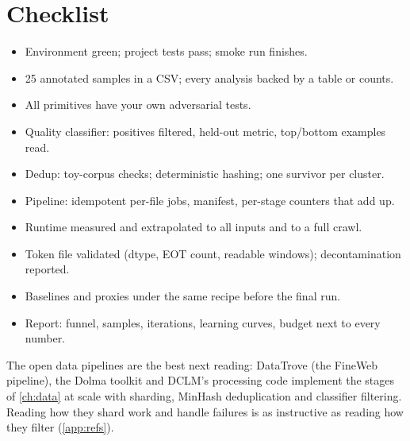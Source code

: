 \section{Checklist}\label{sec:proj4:checklist}

\begin{itemize}
  \item[$\square$] Environment green; project tests pass;  smoke run finishes.
  \item[$\square$] 25 annotated samples in a CSV; every analysis backed by a table or counts.
  \item[$\square$] All primitives have your own adversarial tests.
  \item[$\square$] Quality classifier: positives filtered, held-out metric, top/bottom examples read.
  \item[$\square$] Dedup: toy-corpus checks; deterministic hashing; one survivor per cluster.
  \item[$\square$] Pipeline: idempotent per-file jobs, manifest, per-stage counters that add up.
  \item[$\square$] Runtime measured and extrapolated to all inputs and to a full crawl.
  \item[$\square$] Token file validated (dtype, EOT count, readable windows); decontamination reported.
  \item[$\square$] Baselines and proxies under the same recipe before the final run.
  \item[$\square$] Report: funnel, samples, iterations, learning curves, budget next to every number.
\end{itemize}

\begin{deepdive}
The open data pipelines are the best next reading: DataTrove (the FineWeb pipeline), the Dolma
toolkit and DCLM's processing code implement the stages of \cref{ch:data} at scale with sharding,
MinHash deduplication and classifier filtering. Reading how they shard work and handle failures is as
instructive as reading how they filter (\cref{app:refs}).
\end{deepdive}
